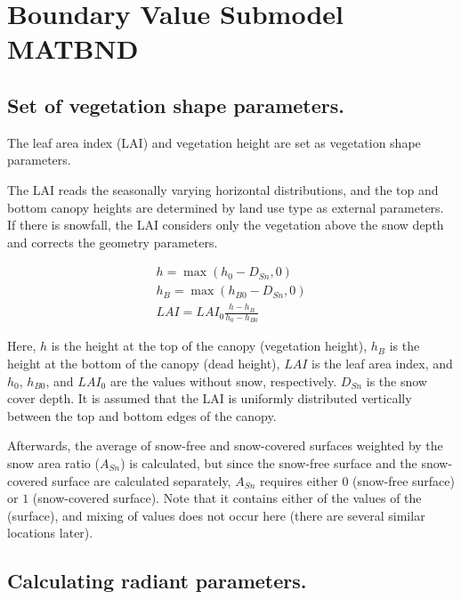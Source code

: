 \hypertarget{boundary-value-submodel-matbnd}{%
\section{Boundary Value Submodel
MATBND}\label{boundary-value-submodel-matbnd}}

\hypertarget{set-of-vegetation-shape-parameters.}{%
\subsection{Set of vegetation shape
parameters.}\label{set-of-vegetation-shape-parameters.}}

The leaf area index (LAI) and vegetation height are set as vegetation
shape parameters.

The LAI reads the seasonally varying horizontal distributions, and the
top and bottom canopy heights are determined by land use type as
external parameters. If there is snowfall, the LAI considers only the
vegetation above the snow depth and corrects the geometry parameters.

\begin{eqnarray}
 h = \max( h_0 - D_{Sn}, 0 ) \\
 h_B = \max( h_{B0} - D_{Sn}, 0 ) \\
 LAI = LAI_0 \frac{h-h_B}{h_0-h_{B0}}
\end{eqnarray}

Here, \(h\) is the height at the top of the canopy (vegetation height),
\(h_B\) is the height at the bottom of the canopy (dead height), \(LAI\)
is the leaf area index, and \(h_0\), \(h_{B0}\), and \(LAI_0\) are the
values without snow, respectively. \(D_{Sn}\) is the snow cover depth.
It is assumed that the LAI is uniformly distributed vertically between
the top and bottom edges of the canopy.

Afterwards, the average of snow-free and snow-covered surfaces weighted
by the snow area ratio (\(A_{Sn}\)) is calculated, but since the
snow-free surface and the snow-covered surface are calculated
separately, \(A_{Sn}\) requires either \(0\) (snow-free surface) or
\(1\) (snow-covered surface). Note that it contains either of the values
of the (surface), and mixing of values does not occur here (there are
several similar locations later).

\hypertarget{calculating-radiant-parameters.}{%
\subsection{Calculating radiant
parameters.}\label{calculating-radiant-parameters.}}

